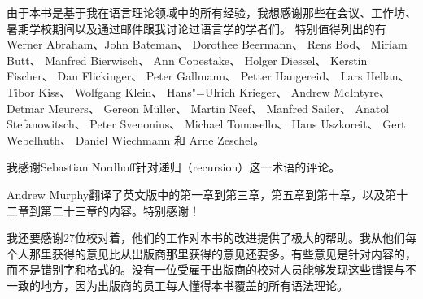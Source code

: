 由于本书是基于我在语言理论领域中的所有经验，我想感谢那些在会议、工作坊、暑期学校期间以及通过邮件跟我讨论过语言学的学者们。
特别值得列出的有Werner Abraham、John Bateman、
Dorothee Beermann、
Rens Bod、
Miriam Butt、
Manfred Bierwisch、
Ann Copestake、
Holger Diessel、
Kerstin Fischer、
Dan Flickinger、
Peter Gallmann、
Petter Haugereid、
Lars Hellan、
Tibor Kiss、
Wolfgang Klein、 
Hans"=Ulrich Krieger、
Andrew McIntyre、
Detmar Meurers、
Gereon Müller、
Martin Neef、
Manfred Sailer、 
Anatol Stefanowitsch、
Peter Svenonius、
Michael Tomasello、 
Hans Uszkoreit、
Gert Webelhuth、
Daniel Wiechmann 
和
Arne Zeschel。

我感谢Sebastian Nordhoff针对递归（recursion）这一术语的评论。

Andrew Murphy翻译了英文版中的第一章到第三章，第五章到第十章，以及第十二章到第二十三章的内容。特别感谢！

我还要感谢27位校对着，他们的工作对本书的改进提供了极大的帮助。我从他们每个人那里获得的意见比从出版商那里获得的意见还要多。有些意见是针对内容的，而不是错别字和格式的。没有一位受雇于出版商的校对人员能够发现这些错误与不一致的地方，因为出版商的员工每人懂得本书覆盖的所有语法理论。

